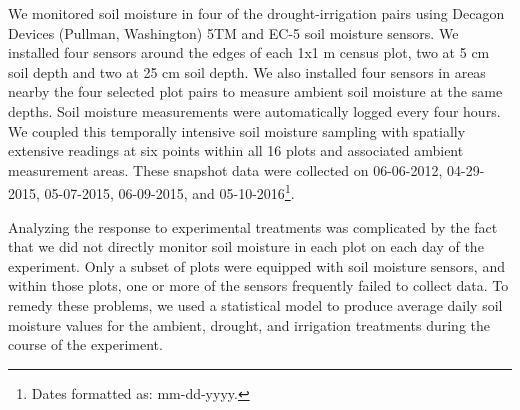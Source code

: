 \documentclass[fleqn,10pt,lineno]{wlpeerj} %
\begin{document}
We monitored soil moisture in four of the drought-irrigation pairs using
Decagon Devices (Pullman, Washington) 5TM and EC-5 soil moisture
sensors. We installed four sensors around the edges of each 1x1 m census
plot, two at 5 cm soil depth and two at 25 cm soil depth. We also
installed four sensors in areas nearby the four selected plot pairs to
measure ambient soil moisture at the same depths. Soil moisture
measurements were automatically logged every four hours. We coupled this
temporally intensive soil moisture sampling with spatially extensive
readings  at six points within
all 16 plots and associated ambient measurement areas. These snapshot
data were collected on 06-06-2012, 04-29-2015, 05-07-2015, 06-09-2015,
and 05-10-2016\footnote{Dates formatted as: mm-dd-yyyy.}.

Analyzing the response to experimental treatments was complicated by the
fact that we did not directly monitor soil moisture in each plot on each
day of the experiment. Only a subset of plots were equipped with soil
moisture sensors, and within those plots, one or more of the sensors
frequently failed to collect data. To remedy these problems, we used a
statistical model to produce average daily soil moisture values for the
ambient, drought, and irrigation treatments during the course of the
experiment.

\end{document}
